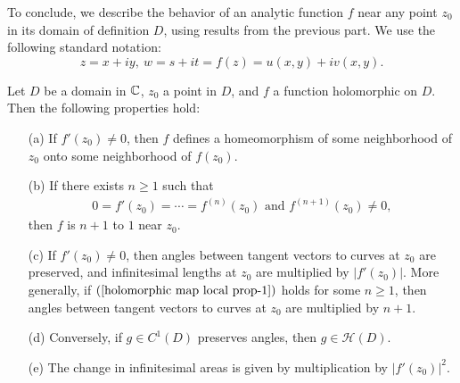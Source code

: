 To conclude, we describe the behavior of an analytic function $f$ near any point $z_0$ in its domain of definition $D$, using results from the previous part. We use the following standard notation:
\[z=x+iy,\ w=s+it=f(z)=u(x,y)+iv(x,y).\]
\begin{proposition}\label{holomorphic map local prop}
Let $D$ be a domain in $\mathbb{C}$, $z_0$ a point in $D$, and $f$ a function holomorphic on $D$. Then the following properties hold:
\begin{itemize}
\item[(a)] If $f'(z_0)\neq 0$, then $f$ defines a homeomorphism of some neighborhood of $z_0$ onto some neighborhood of $f(z_0)$.
\item[(b)] If there exists $n\geq 1$ such that
\begin{align}\label{holomorphic map local prop-1}
0=f'(z_0)=\cdots=f^{(n)}(z_0)\text{ and }f^{(n+1)}(z_0)\neq 0,
\end{align}
then $f$ is $n+1$ to $1$ near $z_0$. 
\item[(c)] If $f'(z_0)\neq 0$, then angles between tangent vectors to curves at $z_0$ are preserved, and infinitesimal lengths at $z_0$ are multiplied by $|f'(z_0)|$. More generally, if $(\ref{holomorphic map local prop-1})$ holds for some $n\geq 1$, then angles between tangent vectors to curves at $z_0$ are multiplied by $n+1$.
\item[(d)] Conversely, if $g\in C^1(D)$ preserves angles, then $g\in\mathcal{H}(D)$.
\item[(e)] The change in infinitesimal areas is given by multiplication by $|f'(z_0)|^2$.
\end{itemize}
\end{proposition}
